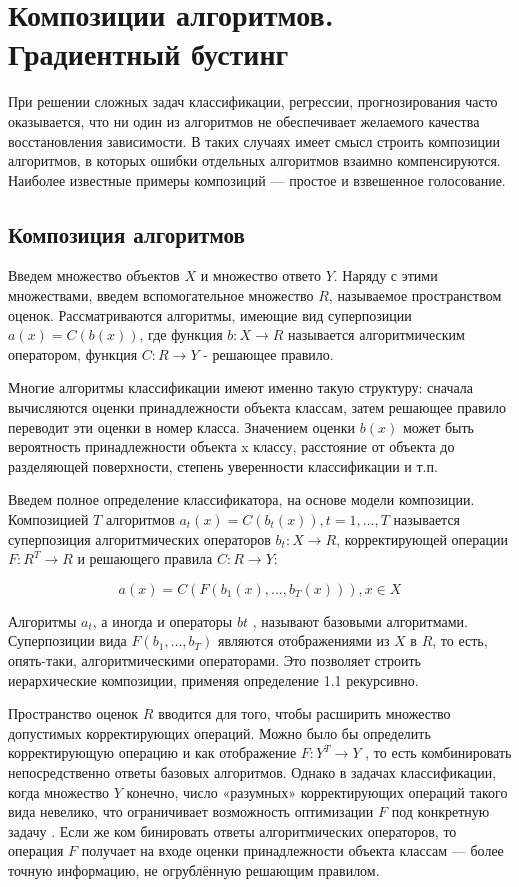 \section{Композиции алгоритмов. Градиентный бустинг}

При решении сложных задач классификации, регрессии, прогнозирования часто оказывается, что ни один из алгоритмов не обеспечивает желаемого качества восстановления зависимости. В таких случаях имеет смысл строить композиции алгоритмов, в которых ошибки отдельных алгоритмов взаимно компенсируются. Наиболее известные примеры композиций — простое и взвешенное голосование. 

\subsection{Композиция алгоритмов}
Введем множество объектов $X$ и множество ответо $Y$. Наряду с этими множествами, введем вспомогательное множество $R$, называемое пространством оценок. Рассматриваются алгоритмы, имеющие вид суперпозиции $a(x)=C(b(x))$, где функция $b: X \to R$ называется алгоритмическим оператором, функция $C: R \to Y$ - решающее правило. 

Многие алгоритмы классификации имеют именно такую структуру: сначала вычисляются оценки принадлежности объекта классам, затем решающее правило переводит эти оценки в номер класса. Значением оценки $b(x)$ может быть вероятность принадлежности объекта x классу, расстояние от объекта до разделяющей поверхности, степень уверенности классификации и т.п.

Введем полное определение классификатора, на основе модели композиции. Композицией $T$ алгоритмов $a_t(x)= C(b_t(x)), t=1,\dotsc,T$ называется суперпозиция алгоритмических операторов $b_t: X \to R$, корректирующей операции  $F: R^T \to R$ и решающего правила $C: R \to Y$:


\begin{equation}
	a(x) = C(F(b_1(x),\dotsc,b_T(x))), x \in X
\end{equation}

Алгоритмы $a_t$, а иногда и операторы $bt$ , называют базовыми алгоритмами. 
Суперпозиции вида $F(b_1,\dotsc, b_T)$ являются отображениями из $X$ в $R$, то есть, опять-таки, алгоритмическими операторами. Это позволяет строить иерархические композиции, применяя определение 1.1 рекурсивно.

Пространство оценок $R$ вводится для того, чтобы расширить множество допустимых корректирующих операций. Можно было бы определить корректирующую операцию и как отображение $F: Y^T \to Y$ , то есть комбинировать непосредственно ответы базовых алгоритмов. Однако в задачах классификации, когда множество $Y$ конечно, число «разумных» корректирующих операций такого вида невелико, что ограничивает возможность оптимизации $F$ под конкретную задачу \todobiography. Если же ком бинировать ответы алгоритмических операторов, то операция $F$ получает на входе оценки принадлежности объекта классам — более точную информацию, не огрублённую решающим правилом.

